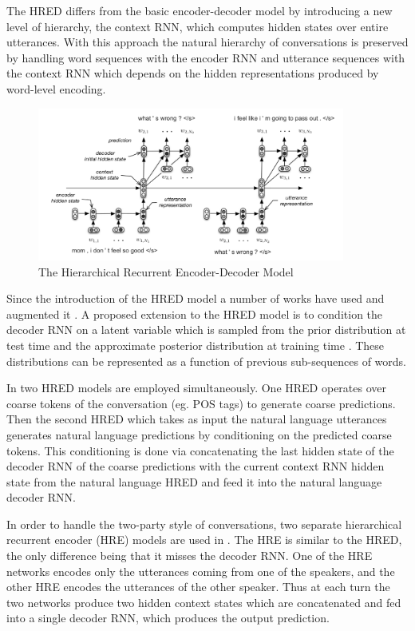 \documentclass[12pt]{article}
\begin{document}
The HRED differs from the basic encoder-decoder model by introducing a new level of hierarchy, the context RNN, which computes hidden states over entire utterances. With this approach the natural hierarchy of conversations is preserved by handling word sequences with the encoder RNN and utterance sequences with the context RNN which depends on the hidden representations produced by word-level encoding.

\begin{figure}[H]
	\label{fig:HRED}
	\centering
	\includegraphics[width=0.9\textwidth]{pics/HRED.png}
	\caption{The Hierarchical Recurrent Encoder-Decoder Model \cite{Serban:2015}}
\end{figure}
Since the introduction of the HRED model a number of works have used and augmented it \cite{Serban_VHRED:2017,Serban_MrRNN:2017,Serban:2017,Shen:2017,Li_adversarial:2017}. A proposed extension to the HRED model is to condition the decoder RNN on a latent variable which is sampled from the prior distribution at test time and the approximate posterior distribution at training time \cite{Serban_VHRED:2017}. These distributions can be represented as a function of previous sub-sequences of words. 

In \cite{Serban_MrRNN:2017} two HRED models are employed simultaneously. One HRED operates over coarse tokens of the conversation (eg. POS tags) to generate coarse predictions. Then the second HRED which takes as input the natural language utterances generates natural language predictions by conditioning on the predicted coarse tokens. This conditioning is done via concatenating the last hidden state of the decoder RNN of the coarse predictions with the current context RNN hidden state from the natural language HRED and feed it into the natural language decoder RNN.

In order to handle the two-party style of conversations, two separate hierarchical recurrent encoder (HRE) models are used in \cite{Shen:2017}. The HRE is similar to the HRED, the only difference being that it misses the decoder RNN. One of the HRE networks encodes only the utterances coming from one of the speakers, and the other HRE encodes the utterances of the other speaker. Thus at each turn the two networks produce two hidden context states which are concatenated and fed into a single decoder RNN, which produces the output prediction.
\end{document}
